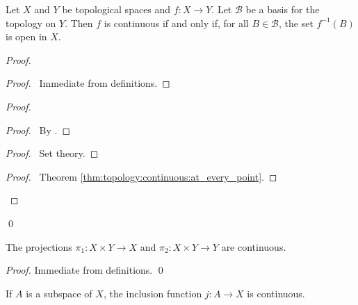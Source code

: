 \begin{lm}
  \label{lm:topology:continuous:basis}
  Let $X$ and $Y$ be topological spaces and $f : X \rightarrow Y$. Let
  $\mathcal{B}$ be a basis for the topology on $Y$. Then $f$ is continuous if
  and only if, for all $B \in \mathcal{B}$, the set $f^{-1}(B)$ is open in
  $X$.
\end{lm}

\begin{proof}
  \pf
  \begin{proof}
    \pf\ Immediate from definitions.
  \end{proof}
  \begin{proof}
    \begin{proof}
      \pf\ By .
    \end{proof}
    \begin{proof}
      \pf\ Set theory.
    \end{proof}
    \qedstep
    \begin{proof}
      \pf\ Theorem \ref{thm:topology:continuous:at_every_point}.
    \end{proof}
  \end{proof}
  \qed
\end{proof}

\begin{lm}
  \label{lm:topology:continuous:projections}
  The projections $\pi_1 : X \times Y \rightarrow X$ and $\pi_2 : X \times Y
  \rightarrow Y$ are continuous.
\end{lm}

\begin{proof}
  \pf Immediate from definitions. \qed
\end{proof}

\begin{thm}
  If $A$ is a subspace of $X$, the inclusion function $j : A \rightarrow
  X$
  is
  continuous.
\end{thm}

